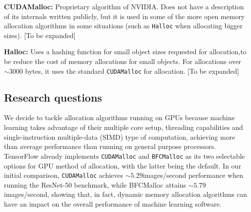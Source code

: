 \documentclass[12pt,twoside]{article}
\newcommand{\resnettimebfc}{$5.79$}     %
\newcommand{\resnettimecuda}{$5.29$}    %
\begin{document}
\textbf{CUDAMalloc:} Proprietary algorithm of NVIDIA. Does not have a description of its internals written publicly, but it is used in some of the more open memory allocation algorithms in some situations (such as \texttt{Halloc} when allocating bigger sizes).
[To be expanded]

\textbf{Halloc:} Uses a hashing function for small object sizes requested for allocation,to be reduce the cost of memory allocations for small objects. For allocations over $\sim3000$ bytes, it uses the standard \texttt{CUDAMalloc} for allocation.
[To be expanded]



\subsection{Research questions}
\label{sec:questions}

We decide to tackle allocation algorithms running on GPUs because machine learning takes advantage of their multiple core setup, threading capabilities and single-instruction multiple-data (SIMD) type of computation, achieving more than average performance than running on general purpose processors. TensorFlow already implements \texttt{CUDAMalloc} and \texttt{BFCMalloc} as its two selectable options for GPU method of allocation, with the latter being the default. In our initial comparison, \texttt{CUDAMalloc} achieves ${\sim}$\resnettimecuda images/second performance when running the ResNet-50 benchmark, while BFCMalloc attains ${\sim}$\resnettimebfc images/second, showing that, in fact, dynamic memory allocation algorithms can have an impact on the overall performance of machine learning software.
\end{document}
